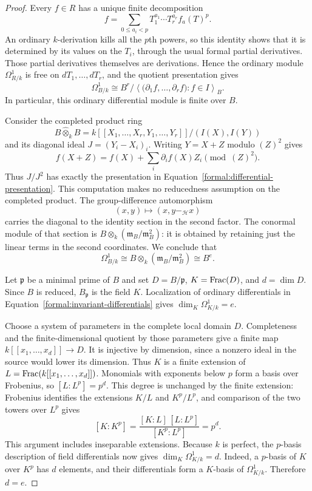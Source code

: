 \begin{proof}
Every $f\in R$ has a unique finite decomposition
\[
  f=\sum_{0\leq a_i<p}T_1^{a_1}\cdots T_r^{a_r}f_a(T)^p.
\]
An ordinary $k$-derivation kills all the $p$th powers, so this identity
shows that it is determined by its values on the $T_i$, through the
usual formal partial derivatives. Those partial derivatives themselves
are derivations. Hence the ordinary module $\Omega^1_{R/k}$ is free
on $dT_1,\ldots,dT_r$, and the quotient presentation gives
\begin{equation}\label{formal:differential-presentation}
  \Omega^1_{B/k}
  \cong B^r\big/
  \left\langle
    \bigl(\partial_1f,\ldots,\partial_rf\bigr):f\in I
  \right\rangle_B.
\end{equation}
In particular, this ordinary differential module is finite over $B$.

Consider the completed product ring
\[
  B\widehat\otimes_k B
  =k[[X_1,\ldots,X_r,Y_1,\ldots,Y_r]]/(I(X),I(Y))
\]
and its diagonal ideal $J=(Y_i-X_i)_i$. Writing $Y=X+Z$ modulo
$(Z)^2$ gives
\[
  f(X+Z)=f(X)+\sum_i\partial_i f(X)Z_i\pmod{(Z)^2}.
\]
Thus $J/J^2$ has exactly the presentation in
Equation~\eqref{formal:differential-presentation}.
This computation makes no reducedness assumption on the completed
product. The group-difference automorphism
\[
  (x,y)\longmapsto(x,y-_{\mathcal H}x)
\]
carries the diagonal to the identity section in the second factor.
The conormal module of that section is
$B\otimes_k(\mathfrak m_B/\mathfrak m_B^2)$: it is obtained by
retaining just the linear terms in the second coordinates. We conclude
that
\begin{equation}\label{formal:invariant-differentials}
  \Omega^1_{B/k}\cong
  B\otimes_k(\mathfrak m_B/\mathfrak m_B^2)\cong B^e.
\end{equation}

Let $\mathfrak p$ be a minimal prime of $B$ and set
$D=B/\mathfrak p$, $K=\operatorname{Frac}(D)$, and $d=\dim D$. Since $B$ is
reduced, $B_{\mathfrak p}$ is the field $K$. Localization of ordinary
differentials in Equation~\eqref{formal:invariant-differentials} gives
$\dim_K\Omega^1_{K/k}=e$.

Choose a system of parameters in the complete local domain $D$.
Completeness and the finite-dimensional quotient by those parameters
give a finite map $k[[x_1,\ldots,x_d]]\to D$. It is injective by
dimension, since a nonzero ideal in the source would lower its
dimension. Thus $K$ is a finite extension of
$L=\operatorname{Frac}(k[[x_1,\ldots,x_d]])$. Monomials with exponents below $p$
form a basis over Frobenius, so $[L:L^p]=p^d$. This degree is unchanged
by the finite extension: Frobenius identifies the extensions $K/L$
and $K^p/L^p$, and comparison of the two towers over $L^p$ gives
\[
  [K:K^p]
  =\frac{[K:L]\,[L:L^p]}{[K^p:L^p]}=p^d.
\]
This argument includes inseparable extensions. Because $k$ is perfect,
the $p$-basis description of field differentials now gives
$\dim_K\Omega^1_{K/k}=d$. Indeed, a $p$-basis of $K$ over $K^p$
has $d$ elements, and their differentials form a $K$-basis of
$\Omega^1_{K/k}$. Therefore $d=e$.


\end{proof}
